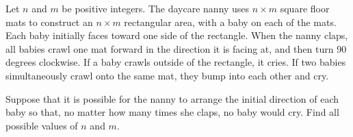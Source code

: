 \begin{problem}
    Let $n$ and $m$ be positive integers. The daycare nanny uses $n \times m$ square floor mats to construct an $n \times m$ rectangular area, with a baby on each of the mats. Each baby initially faces toward one side of the rectangle. When the nanny claps, all babies crawl one mat forward in the direction it is facing at, and then turn 90 degrees clockwise. If a baby crawls outside of the rectangle, it cries. If two babies simultaneously crawl onto the same
mat, they bump into each other and cry.

Suppose that it is possible for the nanny to arrange the initial direction of each baby so that, no matter how many times she claps, no baby would cry. Find all possible values of $n$ and $m$.

    \label{23TWN1}
\end{problem}